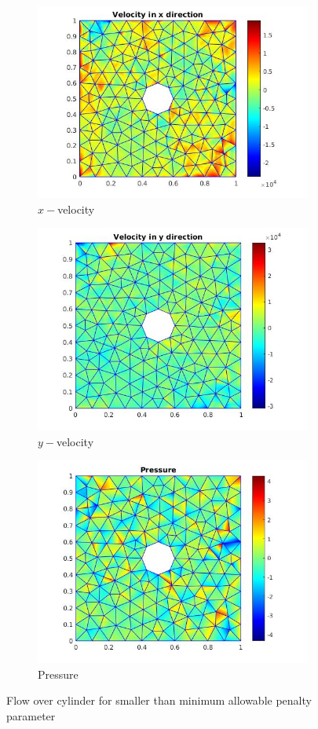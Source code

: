 \documentclass[a4paper,twoside,openright]{book}
\begin{document}
\begin{figure}
\begin{subfigure}{\textwidth}	
    \includegraphics[width=0.8\linewidth]{c11_unphysical_vx.jpg}
    \caption{$x-$velocity}
    \label{x_vel_stoke_c11_low}
\end{subfigure}
\begin{subfigure}{\textwidth}	
    \includegraphics[width=0.8\linewidth]{c11_unphysical_vy.jpg}
    \caption{$y-$velocity}
     \label{y_vel_stoke_c11_low}
\end{subfigure}
\begin{subfigure}{\textwidth}	
    \includegraphics[width=0.8\linewidth]{c11_unphysical_pressure.jpg}
    \caption{Pressure}
      \label{pressure_stoke_c11_low}
\end{subfigure}
\caption{Flow over cylinder for smaller than minimum allowable penalty parameter}
\label{flow_over_cylinder_c11_low}
\end{figure}
\end{document}

